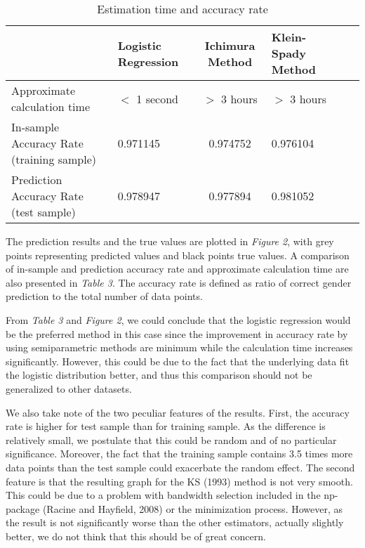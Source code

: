 \begin{table}
    \centering
    \begin{center}
    \begin{tabular}{  m{2cm} | m{3cm} c m{3cm} c m{3cm} |}
      & Logistic Regression & Ichimura Method & Klein-Spady Method
    \tabularnewline
    \midrule
    Approximate calculation time & $<$ 1 second & $>$ 3 hours & $>$ 3 hours
    \tabularnewline
    \midrule
    In-sample Accuracy Rate (training sample) & 0.971145 & 0.974752 & 0.976104
    \tabularnewline
    \midrule
    Prediction Accuracy Rate (test sample) & 0.978947 &  0.977894 & 0.981052 
    \tabularnewline
    \bottomrule
    \end{tabular}
    \end{center}
    \caption {Estimation time and accuracy rate}
\end{table}

The prediction results and the true values are plotted in \textit{Figure 2}, with grey points representing predicted values and black points true values. A comparison of in-sample and prediction accuracy rate and approximate calculation time are also presented in \textit{Table 3}. The accuracy rate is defined as ratio of correct gender prediction to the total number of data points.


From \textit{Table 3} and \textit{Figure 2}, we could conclude that the logistic regression would be the preferred method in this case since the improvement in accuracy rate by using semiparametric methods are minimum while the calculation time increases significantly. However, this could be due to the fact that the underlying data fit the logistic distribution better, and thus this comparison should not be generalized to other datasets. 

We also take note of the two peculiar features of the results. First, the accuracy rate is higher for test sample than for training sample. As the difference is relatively small, we postulate that this could be random and of no particular significance. Moreover, the fact that the training sample contains 3.5 times more data points than the test sample could exacerbate the random effect. The second feature is that the resulting graph for the KS (1993) \cite{[12]} method is not very smooth. This could be due to a problem with bandwidth selection included in the np-package (Racine and Hayfield, 2008) \cite{[28]} or the minimization process. However, as the result is not significantly worse than the other estimators, actually slightly better, we do not think that this should be of great concern.

